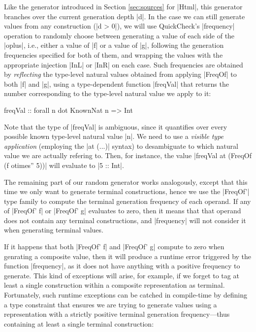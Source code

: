 Like the generator introduced in Section \ref{sec:sources} for |Html|, this
generator branches over the current generation depth |d|.
%
In the case we can still generate values from any construction (|d > 0|), we
will use QuickCheck's |frequency| operation to randomly choose between
generating a value of each side of the |oplus|, i.e., either a value of |f| or a
value of |g|, following the generation frequencies specified for both of them,
and wrapping the values with the appropriate injection |InL| or |InR| on each
case.
%
Such frequencies are obtained by \emph{reflecting} the type-level natural values
obtained from applying |FreqOf| to both |f| and |g|, using a type-dependent
function |freqVal| that returns the number corresponding to the type-level
natural value we apply to it:

\begin{code}
freqVal :: forall n dot KnownNat n => Int
\end{code}

Note that the type of |freqVal| is ambiguous, since it quantifies over every
possible known type-level natural value |n|.
%
We need to use a \emph{visible type application} (employing the |at (...)|
syntax) to desambiguate to which natural value we are actually refering to.
%
Then, for instance, the value |freqVal at (FreqOf (f otimes'' 5))| will evaluate
to |5 :: Int|.

The remaining part of our random generator works analogously, except that this
time we only want to generate terminal constructions, hence we use the |FreqOf'|
type family to compute the terminal generation frequency of each operand.
%
If any of |FreqOf' f| or |FreqOf' g| evaluates to zero, then it means that that
operand does not contain any terminal constructions, and |frequency| will not
consider it when generating terminal values.

If it happens that both |FreqOf' f| and |FreqOf' g| compute to zero when
genrating a composite value, then it will produce a runtime error triggered by
the function |frequency|, as it does not have anything with a positive frequency
to generate.
%
This kind of exceptions will arise, for example, if we forget to tag at least a
single construction within a composite representation as terminal.
%
Fortunately, such runtime exceptions can be catched in compile-time by defining
a type constraint that ensures we are trying to generate values using a
representation with a strictly positive terminal generation frequency---thus
containing at least a single terminal construction:

